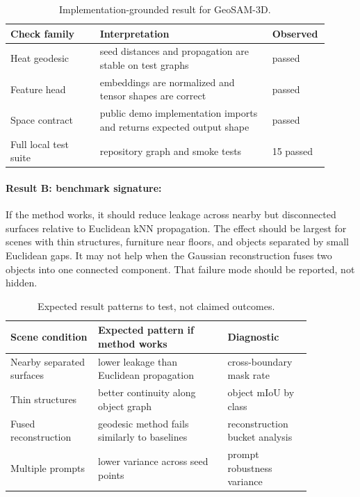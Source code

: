 \documentclass{article}
\begin{document}
\begin{table}[t]
\centering
\caption{Implementation-grounded result for GeoSAM-3D.}
\begin{tabular}{@{}p{0.27\linewidth}p{0.52\linewidth}p{0.12\linewidth}@{}}
\toprule
\textbf{Check family} & \textbf{Interpretation} & \textbf{Observed}\\
\midrule
Heat geodesic & seed distances and propagation are stable on test graphs & passed\\
Feature head & embeddings are normalized and tensor shapes are correct & passed\\
Space contract & public demo implementation imports and returns expected output shape & passed\\
Full local test suite & repository graph and smoke tests & 15 passed\\
\bottomrule
\end{tabular}
\end{table}

\paragraph{Result B: benchmark signature:}

If the method works, it should reduce leakage across nearby but disconnected surfaces relative to Euclidean kNN propagation. The effect should be largest for scenes with thin structures, furniture near floors, and objects separated by small Euclidean gaps. It may not help when the Gaussian reconstruction fuses two objects into one connected component. That failure mode should be reported, not hidden.

\begin{table}[t]
\centering
\caption{Expected result patterns to test, not claimed outcomes.}
\begin{tabular}{@{}p{0.25\linewidth}p{0.37\linewidth}p{0.24\linewidth}@{}}
\toprule
\textbf{Scene condition} & \textbf{Expected pattern if method works} & \textbf{Diagnostic}\\
\midrule
Nearby separated surfaces & lower leakage than Euclidean propagation & cross-boundary mask rate\\
Thin structures & better continuity along object graph & object mIoU by class\\
Fused reconstruction & geodesic method fails similarly to baselines & reconstruction bucket analysis\\
Multiple prompts & lower variance across seed points & prompt robustness variance\\
\bottomrule
\end{tabular}
\end{table}
\end{document}
